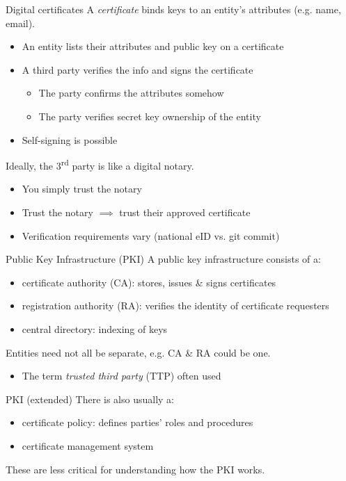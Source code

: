 \begin{frame}{Digital certificates}
  A \emph{certificate} binds keys to an entity's attributes (e.g. name, email).
  \begin{itemize}[<+(1)->]
    \item An entity lists their attributes and public key on a certificate
    \item A third party verifies the info and signs the certificate
    \begin{itemize}
      \item The party confirms the attributes somehow
      \item The party verifies secret key ownership of the entity
    \end{itemize}
    \item Self-signing is possible
  \end{itemize}

  \pause
  Ideally, the 3\textsuperscript{rd} party is like a digital notary.
  \begin{itemize}[<+(1)->]
    \item You simply trust the notary
    \item Trust the notary $\implies$ trust their approved certificate
    \item Verification requirements vary (national eID vs. git commit)
  \end{itemize}
\end{frame}

\begin{frame}{Public Key Infrastructure (PKI)}
  A public key infrastructure consists of a:
  \begin{itemize}[<+(1)->]
    \item certificate authority (CA): stores, issues \& signs certificates
    \item registration authority (RA): verifies the identity of certificate requesters
    \item central directory: indexing of keys
  \end{itemize}

  \pause
  Entities need not all be separate, e.g. CA \& RA could be one.
  \begin{itemize}
    \item The term \emph{trusted third party} (TTP) often used
  \end{itemize}
\end{frame}

\begin{frame}{PKI (extended)}
  \pause
  There is also usually a:
  \begin{itemize}[<+(1)->]
    \item certificate policy: defines parties' roles and procedures
    \item certificate management system
  \end{itemize}

  \pause
  These are less critical for understanding how the PKI works.
\end{frame}

